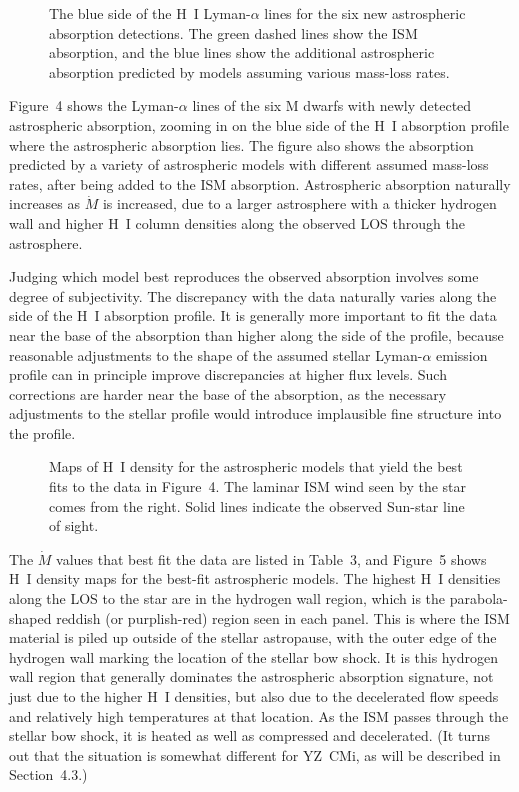 \documentclass[preprint]{aastex}
\begin{document}
\begin{figure}[t]
\caption{The blue side of the H~I Lyman-$\alpha$ lines for the
  six new astrospheric absorption detections.  The green dashed
  lines show the ISM absorption, and the blue lines show the
  additional astrospheric absorption predicted by models
  assuming various mass-loss rates.}
\end{figure}
     Figure~4 shows the Lyman-$\alpha$ lines of the six M dwarfs
with newly detected astrospheric absorption, zooming in on the
blue side of the H~I absorption profile where the astrospheric
absorption lies.  The figure also shows the absorption predicted
by a variety of astrospheric models with different assumed
mass-loss rates, after being added to the ISM absorption.
Astrospheric absorption naturally increases as $\dot{M}$
is increased, due to a larger astrosphere with a thicker
hydrogen wall and higher H~I column densities along the
observed LOS through the astrosphere.

     Judging which model best reproduces the observed absorption
involves some degree of subjectivity.  The discrepancy with the
data naturally varies along the side of the H~I absorption profile.
It is generally more important to fit the data near the base
of the absorption than higher along the side of the profile,
because reasonable adjustments to the shape of the assumed
stellar Lyman-$\alpha$ emission profile can in principle
improve discrepancies at higher flux levels.  Such corrections
are harder near the base of the absorption, as the necessary
adjustments to the stellar profile would introduce
implausible fine structure into the profile.

\begin{figure}[t]
\caption{Maps of H~I density for the astrospheric models that
  yield the best fits to the data in Figure~4.  The laminar
  ISM wind seen by the star comes from the right.  Solid lines
  indicate the observed Sun-star line of sight.}
\end{figure}
     The $\dot{M}$ values that best fit the data are
listed in Table~3, and Figure~5 shows H~I density maps for
the best-fit astrospheric models.  The highest H~I densities
along the LOS to the star are in the hydrogen wall region,
which is the parabola-shaped reddish (or purplish-red) region
seen in each panel.  This is where the ISM material is piled
up outside of the stellar astropause, with the outer edge of the
hydrogen wall marking the location of the stellar bow shock.
It is this hydrogen wall region that generally dominates the
astrospheric absorption signature, not just due to the higher
H~I densities, but also due to the decelerated flow speeds and
relatively high temperatures
at that location.  As the ISM passes through the stellar bow
shock, it is heated as well as compressed and decelerated.
(It turns out that the situation is somewhat different for
YZ~CMi, as will be described in Section~4.3.)
\end{document}
